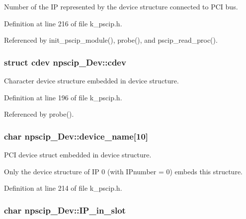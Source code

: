 Number of the IP represented by the device structure connected to PCI bus. 



Definition at line 216 of file k\_\-pscip.h.

Referenced by init\_\-pscip\_\-module(), probe(), and pscip\_\-read\_\-proc().\hypertarget{structnpscip___dev_4990eb4f37675360d8207ff38e6616a3}{
\subsubsection[{cdev}]{\setlength{\rightskip}{0pt plus 5cm}struct {\bf cdev} {\bf npscip\_\-Dev::cdev}}}
\label{structnpscip___dev_4990eb4f37675360d8207ff38e6616a3}


Character device structure embedded in device structure. 



Definition at line 196 of file k\_\-pscip.h.

Referenced by probe().\hypertarget{structnpscip___dev_cc7e28ef3bc0383348dc3839e0589535}{
\subsubsection[{device\_\-name}]{\setlength{\rightskip}{0pt plus 5cm}char {\bf npscip\_\-Dev::device\_\-name}\mbox{[}10\mbox{]}}}
\label{structnpscip___dev_cc7e28ef3bc0383348dc3839e0589535}


PCI device struct embedded in device structure. 

Only the device structure of IP 0 (with IPnumber = 0) embeds this structure. 

Definition at line 214 of file k\_\-pscip.h.\hypertarget{structnpscip___dev_1cfa6d8e96fec37f835e821407e3b3f4}{
\subsubsection[{IP\_\-in\_\-slot}]{\setlength{\rightskip}{0pt plus 5cm}char {\bf npscip\_\-Dev::IP\_\-in\_\-slot}}}
\label{structnpscip___dev_1cfa6d8e96fec37f835e821407e3b3f4}


